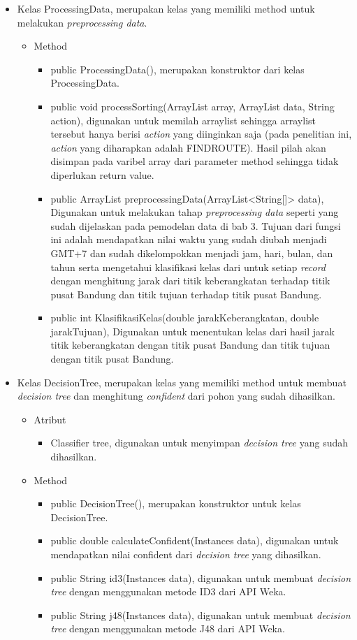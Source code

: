 \begin{itemize}
	\item Kelas ProcessingData, merupakan kelas yang memiliki method untuk melakukan \textsl{preprocessing data}.
	\begin{itemize}
		\item Method
		\begin{itemize}
			\item public ProcessingData(), merupakan konstruktor dari kelas ProcessingData.
			\item public void processSorting(ArrayList array, ArrayList data, String action), digunakan untuk memilah arraylist sehingga arraylist tersebut hanya berisi \textsl{action} yang diinginkan saja (pada penelitian ini, \textsl{action} yang diharapkan adalah FINDROUTE). Hasil pilah akan disimpan pada varibel array dari parameter method sehingga tidak diperlukan return value.
			\item public ArrayList preprocessingData(ArrayList<String[]> data), Digunakan untuk melakukan tahap \textsl{preprocessing data} seperti yang sudah dijelaskan pada pemodelan data di bab 3. Tujuan dari fungsi ini adalah mendapatkan nilai waktu yang sudah diubah menjadi GMT+7 dan sudah dikelompokkan menjadi jam, hari, bulan, dan tahun serta mengetahui klasifikasi kelas dari untuk setiap \textsl{record} dengan menghitung jarak dari titik keberangkatan terhadap titik pusat Bandung dan titik tujuan terhadap titik pusat Bandung.
			\item public int KlasifikasiKelas(double jarakKeberangkatan, double jarakTujuan), Digunakan untuk menentukan kelas dari hasil jarak titik keberangkatan dengan titik pusat Bandung dan titik tujuan dengan titik pusat Bandung. 
		\end{itemize}
	\end{itemize}

	\item Kelas DecisionTree, merupakan kelas yang memiliki method untuk membuat \textsl{decision tree} dan menghitung \textsl{confident} dari pohon yang sudah dihasilkan.
	\begin{itemize}
		\item Atribut
		\begin{itemize}
			\item Classifier tree, digunakan untuk menyimpan \textsl{decision tree} yang sudah dihasilkan.
		\end{itemize}
		\item Method
		\begin{itemize}
			\item public DecisionTree(), merupakan konstruktor untuk kelas DecisionTree.
			\item public double calculateConfident(Instances data), digunakan untuk mendapatkan nilai confident dari \textsl{decision tree} yang dihasilkan.
			\item public String id3(Instances data), digunakan untuk membuat \textsl{decision tree} dengan menggunakan metode ID3 dari API Weka.
			\item public String j48(Instances data), digunakan untuk membuat \textsl{decision tree} dengan menggunakan metode J48 dari API Weka.
		\end{itemize}
	\end{itemize}


\end{itemize}
